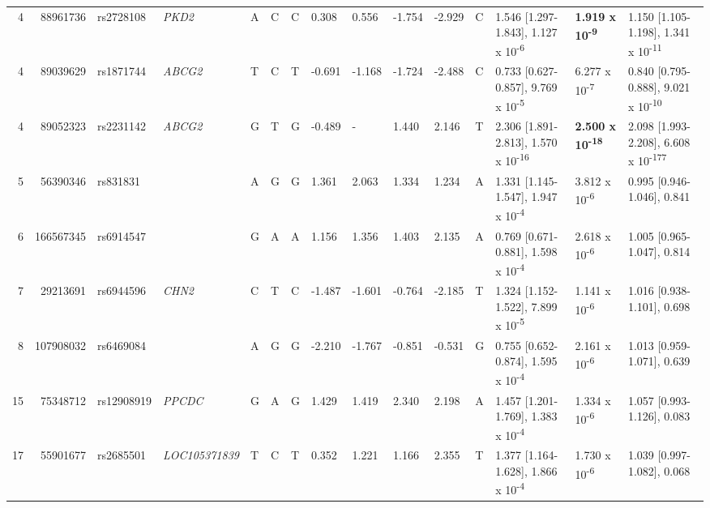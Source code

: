 \documentclass[]{report}
\begin{document}
\begin{landscape}
\begin{table}
{\begin{tabular}[t]{rrlllllllllllll}
\hspace{1em}4 & 88961736 & rs2728108 & \em{PKD2} & A & C & C & 0.308 & 0.556 & -1.754 & -2.929 & C & 1.546 [1.297-1.843], 1.127 x 10\textsuperscript{-6} & \textbf{1.919 x 10\textsuperscript{-9}} & 1.150 [1.105-1.198], 1.341 x 10\textsuperscript{-11}\\
\hspace{1em}4 & 89039629 & rs1871744 & \em{ABCG2} & T & C & T & -0.691 & -1.168 & -1.724 & -2.488 & C & 0.733 [0.627-0.857], 9.769 x 10\textsuperscript{-5} & 6.277 x 10\textsuperscript{-7} & 0.840 [0.795-0.888], 9.021 x 10\textsuperscript{-10}\\
\hspace{1em}4 & 89052323 & rs2231142 & \em{ABCG2} & G & T & G & -0.489 & - & 1.440 & 2.146 & T & 2.306 [1.891-2.813], 1.570 x 10\textsuperscript{-16} & \textbf{2.500 x 10\textsuperscript{-18}} & 2.098 [1.993-2.208], 6.608 x 10\textsuperscript{-177}\\
\hspace{1em}5 & 56390346 & rs831831 & \em{} & A & G & G & 1.361 & 2.063 & 1.334 & 1.234 & A & 1.331 [1.145-1.547], 1.947 x 10\textsuperscript{-4} & 3.812 x 10\textsuperscript{-6} & 0.995 [0.946-1.046], 0.841\\
\hspace{1em}6 & 166567345 & rs6914547 & \em{} & G & A & A & 1.156 & 1.356 & 1.403 & 2.135 & A & 0.769 [0.671-0.881], 1.598 x 10\textsuperscript{-4} & 2.618 x 10\textsuperscript{-6} & 1.005 [0.965-1.047], 0.814\\
\hspace{1em}7 & 29213691 & rs6944596 & \em{CHN2} & C & T & C & -1.487 & -1.601 & -0.764 & -2.185 & T & 1.324 [1.152-1.522], 7.899 x 10\textsuperscript{-5} & 1.141 x 10\textsuperscript{-6} & 1.016 [0.938-1.101], 0.698\\
\hspace{1em}8 & 107908032 & rs6469084 & \em{} & A & G & G & -2.210 & -1.767 & -0.851 & -0.531 & G & 0.755 [0.652-0.874], 1.595 x 10\textsuperscript{-4} & 2.161 x 10\textsuperscript{-6} & 1.013 [0.959-1.071], 0.639\\
\hspace{1em}15 & 75348712 & rs12908919 & \em{PPCDC} & G & A & G & 1.429 & 1.419 & 2.340 & 2.198 & A & 1.457 [1.201-1.769], 1.383 x 10\textsuperscript{-4} & 1.334 x 10\textsuperscript{-6} & 1.057 [0.993-1.126], 0.083\\
\hspace{1em}17 & 55901677 & rs2685501 & \em{LOC105371839} & T & C & T & 0.352 & 1.221 & 1.166 & 2.355 & T & 1.377 [1.164-1.628], 1.866 x 10\textsuperscript{-4} & 1.730 x 10\textsuperscript{-6} & 1.039 [0.997-1.082], 0.068\\

\end{tabular}}
\end{table}
\end{landscape}
\end{document}
